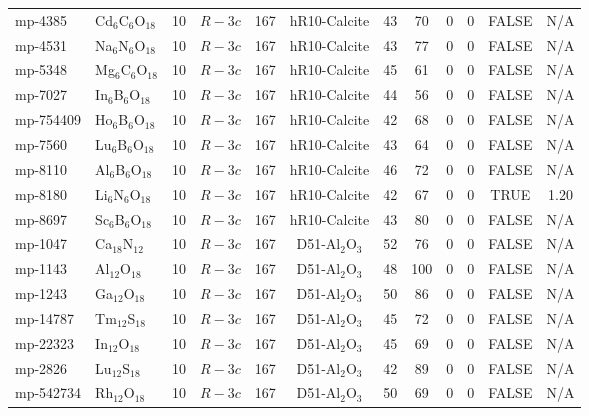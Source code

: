 {\begin{longtable}{llcccccccccc}
    mp-4385 & Cd$_{6}$C$_{6}$O$_{18}$ & 10    & $R-3c$ & 167   & hR10-Calcite & 43    & 70    & 0     & 0     & FALSE & N/A \\
    mp-4531 & Na$_{6}$N$_{6}$O$_{18}$ & 10    & $R-3c$ & 167   & hR10-Calcite & 43    & 77    & 0     & 0     & FALSE & N/A \\
    mp-5348 & Mg$_{6}$C$_{6}$O$_{18}$ & 10    & $R-3c$ & 167   & hR10-Calcite & 45    & 61    & 0     & 0     & FALSE & N/A \\
    mp-7027 & In$_{6}$B$_{6}$O$_{18}$ & 10    & $R-3c$ & 167   & hR10-Calcite & 44    & 56    & 0     & 0     & FALSE & N/A \\
    mp-754409 & Ho$_{6}$B$_{6}$O$_{18}$ & 10    & $R-3c$ & 167   & hR10-Calcite & 42    & 68    & 0     & 0     & FALSE & N/A \\
    mp-7560 & Lu$_{6}$B$_{6}$O$_{18}$ & 10    & $R-3c$ & 167   & hR10-Calcite & 43    & 64    & 0     & 0     & FALSE & N/A \\
    mp-8110 & Al$_{6}$B$_{6}$O$_{18}$ & 10    & $R-3c$ & 167   & hR10-Calcite & 46    & 72    & 0     & 0     & FALSE & N/A \\
    mp-8180 & Li$_{6}$N$_{6}$O$_{18}$ & 10    & $R-3c$ & 167   & hR10-Calcite & 42    & 67    & 0     & 0     & TRUE  & 1.20  \\
    mp-8697 & Sc$_{6}$B$_{6}$O$_{18}$ & 10    & $R-3c$ & 167   & hR10-Calcite & 43    & 80    & 0     & 0     & FALSE & N/A \\
    mp-1047 & Ca$_{18}$N$_{12}$ & 10    & $R-3c$ & 167   & D51-Al$_{2}$O$_{3}$ & 52    & 76    & 0     & 0     & FALSE & N/A \\
    mp-1143 & Al$_{12}$O$_{18}$ & 10    & $R-3c$ & 167   & D51-Al$_{2}$O$_{3}$ & 48    & 100   & 0     & 0     & FALSE & N/A \\
    mp-1243 & Ga$_{12}$O$_{18}$ & 10    & $R-3c$ & 167   & D51-Al$_{2}$O$_{3}$ & 50    & 86    & 0     & 0     & FALSE & N/A \\
    mp-14787 & Tm$_{12}$S$_{18}$ & 10    & $R-3c$ & 167   & D51-Al$_{2}$O$_{3}$ & 45    & 72    & 0     & 0     & FALSE & N/A \\
    mp-22323 & In$_{12}$O$_{18}$ & 10    & $R-3c$ & 167   & D51-Al$_{2}$O$_{3}$ & 45    & 69    & 0     & 0     & FALSE & N/A \\
    mp-2826 & Lu$_{12}$S$_{18}$ & 10    & $R-3c$ & 167   & D51-Al$_{2}$O$_{3}$ & 42    & 89    & 0     & 0     & FALSE & N/A \\
    mp-542734 & Rh$_{12}$O$_{18}$ & 10    & $R-3c$ & 167   & D51-Al$_{2}$O$_{3}$ & 50    & 69    & 0     & 0     & FALSE & N/A \\

\end{longtable}}
